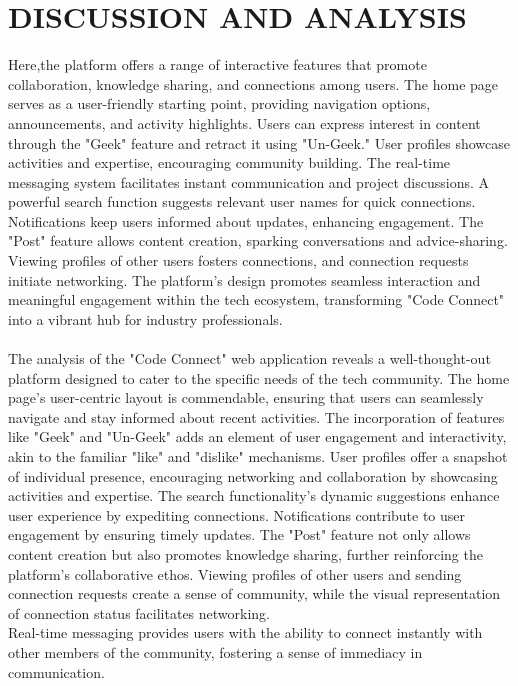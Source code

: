 \chapter{DISCUSSION AND ANALYSIS}
Here,the platform offers a range of interactive features that promote collaboration, knowledge sharing, and connections among users. The home page serves as a user-friendly starting point, providing navigation options, announcements, and activity highlights. Users can express interest in content through the "Geek" feature and retract it using "Un-Geek." User profiles showcase activities and expertise, encouraging community building. The real-time messaging system facilitates instant communication and project discussions. A powerful search function suggests relevant user names for quick connections. Notifications keep users informed about updates, enhancing engagement. The "Post" feature allows content creation, sparking conversations and advice-sharing. Viewing profiles of other users fosters connections, and connection requests initiate networking. The platform's design promotes seamless interaction and meaningful engagement within the tech ecosystem, transforming "Code Connect" into a vibrant hub for industry professionals.
\\\\
The analysis of the "Code Connect" web application reveals a well-thought-out platform designed to cater to the specific needs of the tech community. The home page's user-centric layout is commendable, ensuring that users can seamlessly navigate and stay informed about recent activities. The incorporation of features like "Geek" and "Un-Geek" adds an element of user engagement and interactivity, akin to the familiar "like" and "dislike" mechanisms. User profiles offer a snapshot of individual presence, encouraging networking and collaboration by showcasing activities and expertise. The search functionality's dynamic suggestions enhance user experience by expediting connections. Notifications contribute to user engagement by ensuring timely updates. 
\newline
The "Post" feature not only allows content creation but also promotes knowledge sharing, further reinforcing the platform's collaborative ethos. Viewing profiles of other users and sending connection requests create a sense of community, while the visual representation of connection status facilitates networking.
\\
\newline
Real-time messaging provides users with the ability to connect instantly with other members of the community, fostering a sense of immediacy in communication. 
